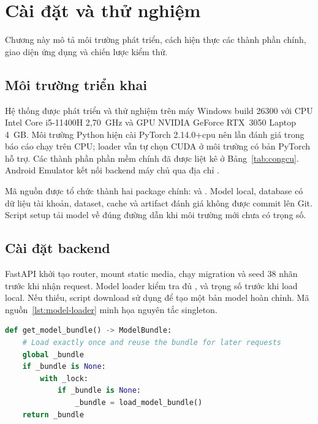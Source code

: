 \chapter{Cài đặt và thử nghiệm}
\label{ch:caidat}

\begin{muctieu}
Chương này mô tả môi trường phát triển, cách hiện thực các thành phần chính,
giao diện ứng dụng và chiến lược kiểm thử.
\end{muctieu}

\section{Môi trường triển khai}

Hệ thống được phát triển và thử nghiệm trên máy Windows build 26300 với CPU
Intel Core i5-11400H 2,70~GHz và GPU NVIDIA GeForce RTX~3050 Laptop 4~GB.
Môi trường Python hiện cài PyTorch 2.14.0+cpu nên lần đánh giá trong báo cáo
chạy trên CPU; loader vẫn tự chọn CUDA ở môi trường có bản PyTorch hỗ trợ.
Các thành
phần phần mềm chính đã được liệt kê ở Bảng~\ref{tab:congcu}. Android Emulator
kết nối backend máy chủ qua địa chỉ .

Mã nguồn được tổ chức thành hai package chính:  và
. Model local, database có dữ liệu tài khoản, dataset, cache và
artifact đánh giá không được commit lên Git. Script setup tải model về đúng
đường dẫn khi môi trường mới chưa có trọng số.

\section{Cài đặt backend}

FastAPI khởi tạo router, mount static media, chạy migration và seed 38 nhãn
trước khi nhận request. Model loader kiểm tra đủ ,
 và trọng số trước khi load local. Nếu thiếu,
script download sử dụng  để tạo một bản model hoàn
chỉnh. Mã nguồn~\ref{lst:model-loader} minh họa nguyên tắc singleton.

\begin{lstlisting}[language=Python, caption={Nạp model một lần cho toàn bộ tiến trình.}, label={lst:model-loader}]
def get_model_bundle() -> ModelBundle:
    # Load exactly once and reuse the bundle for later requests
    global _bundle
    if _bundle is None:
        with _lock:
            if _bundle is None:
                _bundle = load_model_bundle()
    return _bundle
\end{lstlisting}

